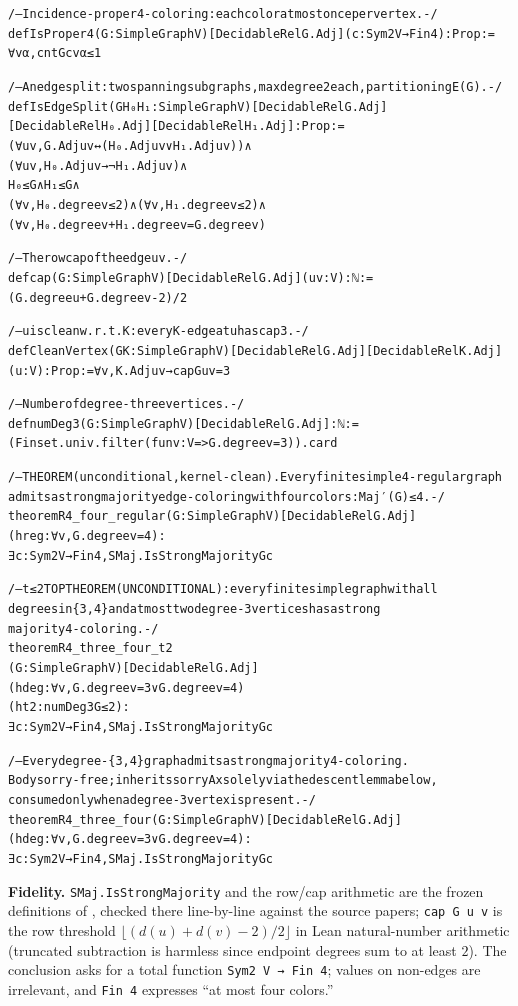 \documentclass[11pt]{article}
\theoremstyle{definition}
\theoremstyle{remark}
\begin{document}
{\small
\begin{alltt}
/-- Incidence-proper 4-coloring: each color at most once per vertex. -/
def IsProper4 (G : SimpleGraph V) [DecidableRel G.Adj] (c : Sym2 V → Fin 4) : Prop :=
  ∀ v α, cnt G c v α ≤ 1

/-- An edge split: two spanning subgraphs, max degree 2 each, partitioning E(G). -/
def IsEdgeSplit (G H₀ H₁ : SimpleGraph V) [DecidableRel G.Adj]
    [DecidableRel H₀.Adj] [DecidableRel H₁.Adj] : Prop :=
  (∀ u v, G.Adj u v ↔ (H₀.Adj u v ∨ H₁.Adj u v)) ∧
  (∀ u v, H₀.Adj u v → ¬ H₁.Adj u v) ∧
  H₀ ≤ G ∧ H₁ ≤ G ∧
  (∀ v, H₀.degree v ≤ 2) ∧ (∀ v, H₁.degree v ≤ 2) ∧
  (∀ v, H₀.degree v + H₁.degree v = G.degree v)

/-- The row cap of the edge uv. -/
def cap (G : SimpleGraph V) [DecidableRel G.Adj] (u v : V) : ℕ :=
  (G.degree u + G.degree v - 2) / 2

/-- u is clean w.r.t. K: every K-edge at u has cap 3. -/
def CleanVertex (G K : SimpleGraph V) [DecidableRel G.Adj] [DecidableRel K.Adj]
    (u : V) : Prop := ∀ v, K.Adj u v → cap G u v = 3

/-- Number of degree-three vertices. -/
def numDeg3 (G : SimpleGraph V) [DecidableRel G.Adj] : ℕ :=
  (Finset.univ.filter (fun v : V => G.degree v = 3)).card

/-- THEOREM (unconditional, kernel-clean).  Every finite simple 4-regular graph
    admits a strong majority edge-coloring with four colors: Maj′(G) ≤ 4. -/
theorem R4_four_regular (G : SimpleGraph V) [DecidableRel G.Adj]
    (hreg : ∀ v, G.degree v = 4) :
    ∃ c : Sym2 V → Fin 4, SMaj.IsStrongMajority G c

/-- t ≤ 2 TOP THEOREM (UNCONDITIONAL): every finite simple graph with all
    degrees in \{3, 4\} and at most two degree-3 vertices has a strong
    majority 4-coloring. -/
theorem R4_three_four_t2
    (G : SimpleGraph V) [DecidableRel G.Adj]
    (hdeg : ∀ v, G.degree v = 3 ∨ G.degree v = 4)
    (ht2 : numDeg3 G ≤ 2) :
    ∃ c : Sym2 V → Fin 4, SMaj.IsStrongMajority G c

/-- Every degree-\{3,4\} graph admits a strong majority 4-coloring.
    Body sorry-free; inherits sorryAx solely via the descent lemma below,
    consumed only when a degree-3 vertex is present. -/
theorem R4_three_four (G : SimpleGraph V) [DecidableRel G.Adj]
    (hdeg : ∀ v, G.degree v = 3 ∨ G.degree v = 4) :
    ∃ c : Sym2 V → Fin 4, SMaj.IsStrongMajority G c
\end{alltt}
}

\noindent\textbf{Fidelity.} \texttt{SMaj.IsStrongMajority} and the row/cap arithmetic are the frozen definitions of \cite{E5}, checked there line-by-line against the source papers; \texttt{cap G u v} is the row threshold $\lfloor(d(u)+d(v)-2)/2\rfloor$ in Lean natural-number arithmetic (truncated subtraction is harmless since endpoint degrees sum to at least $2$). The conclusion asks for a total function \texttt{Sym2 V → Fin 4}; values on non-edges are irrelevant, and \texttt{Fin 4} expresses ``at most four colors.''
\end{document}
